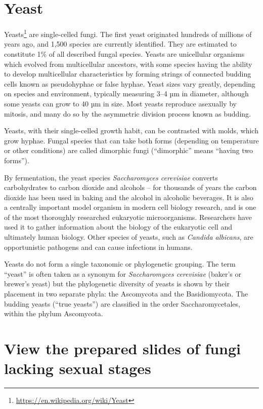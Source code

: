 \documentclass[]{book}
\let\rmarkdownfootnote\footnote%
\def\footnote{\protect\rmarkdownfootnote}
\renewcommand{\href}[2]{#2\footnote{\url{#1}}}
\theoremstyle{definition}
\theoremstyle{definition}
\theoremstyle{definition}
\theoremstyle{remark}
\begin{document}
\section{Yeast}\label{yeast}

\href{https://en.wikipedia.org/wiki/Yeast}{Yeasts} are single-celled
fungi. The first yeast originated hundreds of millions of years ago, and
1,500 species are currently identified. They are estimated to constitute
1\% of all described fungal species. Yeasts are unicellular organisms
which evolved from multicellular ancestors, with some species having the
ability to develop multicellular characteristics by forming strings of
connected budding cells known as pseudohyphae or false hyphae. Yeast
sizes vary greatly, depending on species and environment, typically
measuring 3--4 µm in diameter, although some yeasts can grow to 40 µm in
size. Most yeasts reproduce asexually by mitosis, and many do so by the
asymmetric division process known as budding.

Yeasts, with their single-celled growth habit, can be contrasted with
molds, which grow hyphae. Fungal species that can take both forms
(depending on temperature or other conditions) are called dimorphic
fungi (``dimorphic'' means ``having two forms'').

By fermentation, the yeast species \emph{Saccharomyces cerevisiae}
converts carbohydrates to carbon dioxide and alcohols -- for thousands
of years the carbon dioxide has been used in baking and the alcohol in
alcoholic beverages. It is also a centrally important model organism in
modern cell biology research, and is one of the most thoroughly
researched eukaryotic microorganisms. Researchers have used it to gather
information about the biology of the eukaryotic cell and ultimately
human biology. Other species of yeasts, such as \emph{Candida albicans},
are opportunistic pathogens and can cause infections in humans.

Yeasts do not form a single taxonomic or phylogenetic grouping. The term
``yeast'' is often taken as a synonym for \emph{Saccharomyces
cerevisiae} (baker's or brewer's yeast) but the phylogenetic diversity
of yeasts is shown by their placement in two separate phyla: the
Ascomycota and the Basidiomycota. The budding yeasts (``true yeasts'')
are classified in the order Saccharomycetales, within the phylum
Ascomycota.

\section{View the prepared slides of fungi lacking sexual
stages}\label{view-the-prepared-slides-of-fungi-lacking-sexual-stages}
\end{document}
